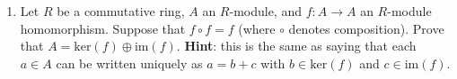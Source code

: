 \documentclass[11pt]{article}
\begin{document}
\begin{enumerate}
\item Let $R$ be a commutative ring, $A$ an $R$-module, and $f\colon A \to A$ an $R$-module homomorphism. Suppose that $f \circ f = f$ (where $\circ$ denotes composition). Prove that $A = \mathrm{ker}(f) \oplus \mathrm{im}(f)$. {\bf Hint}: this is the same as saying that each $a\in A$ can be written uniquely as $a=b+c$ with $b \in \mathrm{ker}(f)$ and $c \in \mathrm{im}(f)$.

\end{enumerate}
\end{document}
